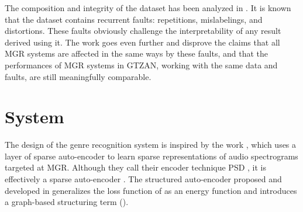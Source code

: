 The composition and integrity of the dataset has been analyzed in \cite{sturm2012GTZANanalysis}. It is known that the dataset contains recurrent faults: repetitions, mislabelings, and distortions. These faults obviously challenge the interpretability of any result derived using it. The work \cite{sturm2013GTZANcritic} goes even further and disprove the claims that all \gls{MGR} systems are affected in the same ways by these faults, and that the performances of \gls{MGR} systems in GTZAN, working with the same data and faults, are still meaningfully comparable.







\chapter{System} \label{chap:system}

The design of the genre recognition system is inspired by the work \cite{lecun2011PSDaudio}, which uses a layer of sparse auto-encoder to learn sparse representations of audio spectrograms targeted at \gls{MGR}. Although they call their encoder technique \gls{PSD} \cite{lecun2010PSD}, it is effectively a sparse auto-encoder \cite{bengio2009learningDeepAI}. The structured auto-encoder proposed and developed in  generalizes the loss function of \cite{lecun2011PSDaudio} as an energy function and introduces a graph-based structuring term ().

